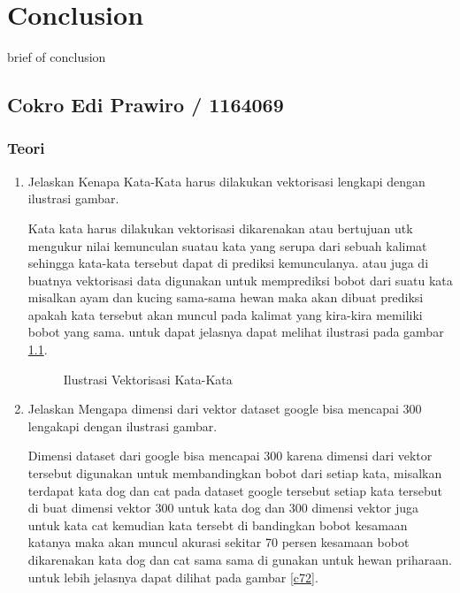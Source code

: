 \chapter{Conclusion}
brief of conclusion

\section{Cokro Edi Prawiro / 1164069}

\subsection{Teori}
\begin{enumerate}

\item Jelaskan Kenapa Kata-Kata harus dilakukan vektorisasi lengkapi dengan ilustrasi gambar.\par
Kata kata harus dilakukan vektorisasi dikarenakan atau bertujuan utk mengukur nilai kemunculan suatau kata yang serupa dari sebuah kalimat sehingga kata-kata tersebut dapat di prediksi kemunculanya. atau juga di buatnya vektorisasi data digunakan untuk memprediksi bobot dari suatu kata misalkan ayam dan kucing sama-sama hewan maka akan dibuat prediksi apakah kata tersebut akan muncul pada kalimat yang kira-kira memiliki bobot yang sama. untuk dapat jelasnya dapat melihat ilustrasi pada gambar \ref{c71}.

\begin{figure}[!htbp]
      \caption{Ilustrasi Vektorisasi Kata-Kata}
      \label{c71}
      \end{figure}

\item Jelaskan Mengapa dimensi dari vektor dataset google bisa mencapai 300 lengakapi dengan ilustrasi gambar. \par
Dimensi dataset dari google bisa mencapai 300 karena dimensi dari vektor tersebut digunakan untuk membandingkan bobot dari setiap kata, misalkan terdapat kata dog dan cat pada dataset google tersebut setiap kata tersebut di buat dimensi vektor 300 untuk kata dog dan 300 dimensi vektor juga untuk kata cat kemudian kata tersebt di bandingkan bobot kesamaan katanya maka akan muncul akurasi sekitar 70 persen kesamaan bobot dikarenakan kata dog dan cat sama sama di gunakan untuk hewan priharaan. untuk lebih jelasnya dapat dilihat pada gambar \ref{c72}.


\end{enumerate}
